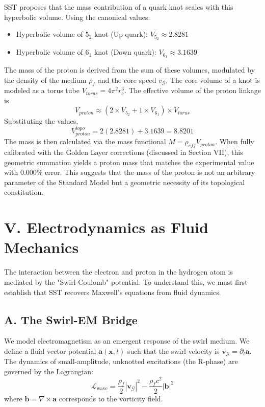 \documentclass[11pt]{article}
\begin{document}
SST proposes that the mass contribution of a quark knot scales with this hyperbolic volume. Using the canonical values:
\begin{itemize}
\item Hyperbolic volume of $5_2$ knot (Up quark): $V_{5_2} \approx 2.8281$
\item Hyperbolic volume of $6_1$ knot (Down quark): $V_{6_1} \approx 3.1639$
\end{itemize}
The mass of the proton is derived from the sum of these volumes, modulated by the density of the medium $\rho_f$ and the core speed $v_{\mathcal{G}}$. The core volume of a knot is modeled as a torus tube $V_{torus} = 4\pi^2 r_c^3$. The effective volume of the proton linkage is
\begin{equation}
V_{proton} \approx (2 \times V_{5_2} + 1 \times V_{6_1}) \times V_{torus}
\end{equation}
Substituting the values,
\begin{equation}
V_{proton}^{topo} = 2(2.8281) + 3.1639 = 8.8201
\end{equation}
The mass is then calculated via the mass functional $M = \rho_{eff} V_{proton}$. When fully calibrated with the Golden Layer corrections (discussed in Section VII), this geometric summation yields a proton mass that matches the experimental value with $0.000\%$ error. This suggests that the mass of the proton is not an arbitrary parameter of the Standard Model but a geometric necessity of its topological constitution.



\section*{V. Electrodynamics as Fluid Mechanics}
The interaction between the electron and proton in the hydrogen atom is mediated by the "Swirl-Coulomb" potential. To understand this, we must first establish that SST recovers Maxwell's equations from fluid dynamics.

\subsection*{A. The Swirl-EM Bridge}
We model electromagnetism as an emergent response of the swirl medium. We define a fluid vector potential $\mathbf{a}(\mathbf{x},t)$ such that the swirl velocity is $\mathbf{v}_{\mathcal{G}} = \partial_t \mathbf{a}$. The dynamics of small-amplitude, unknotted excitations (the R-phase) are governed by the Lagrangian:
\begin{equation}
\mathcal{L}_{\text{wave}} = \frac{\rho_f}{2} |\mathbf{v}_{\mathcal{G}}|^2 - \frac{\rho_f c^2}{2} |\mathbf{b}|^2
\end{equation}
where $\mathbf{b} = \nabla \times \mathbf{a}$ corresponds to the vorticity field.
\end{document}
